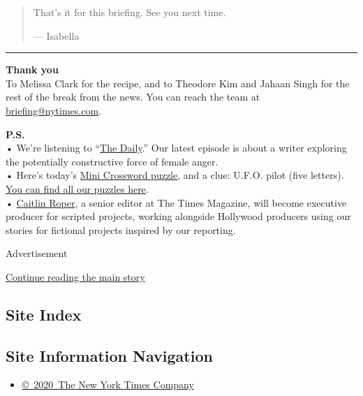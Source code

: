 \begin{quote}
That's it for this briefing. See you next time.

--- Isabella
\end{quote}

\begin{center}\rule{0.5\linewidth}{\linethickness}\end{center}

\textbf{Thank you}\\
To Melissa Clark for the recipe, and to Theodore Kim and Jahaan Singh
for the rest of the break from the news. You can reach the team at
\href{mailto:briefing+midnight@nytimes.com?subject=Briefing\%20Feedback}{briefing@nytimes.com}.

\textbf{P.S.}\\
• We're listening to ``\href{https://www.nytimes.com/thedaily}{The
Daily}.'' Our latest episode is about a writer exploring the potentially
constructive force of female anger.\\
• Here's today's
\href{https://www.nytimes.com/crosswords/game/mini}{Mini Crossword
puzzle}, and a clue: U.F.O. pilot (five letters).
\href{https://www.nytimes.com/crosswords}{You can find all our puzzles
here}.\\
•
\href{https://www.nytco.com/press/caitlin-roper-named-executive-producer-for-scripted-projects/}{Caitlin
Roper}, a senior editor at The Times Magazine, will become executive
producer for scripted projects, working alongside Hollywood producers
using our stories for fictional projects inspired by our reporting.

Advertisement

\protect\hyperlink{after-bottom}{Continue reading the main story}

\hypertarget{site-index}{%
\subsection{Site Index}\label{site-index}}

\hypertarget{site-information-navigation}{%
\subsection{Site Information
Navigation}\label{site-information-navigation}}

\begin{itemize}
\tightlist
\item
  \href{https://help.nytimes.com/hc/en-us/articles/115014792127-Copyright-notice}{©~2020~The
  New York Times Company}
\end{itemize}

